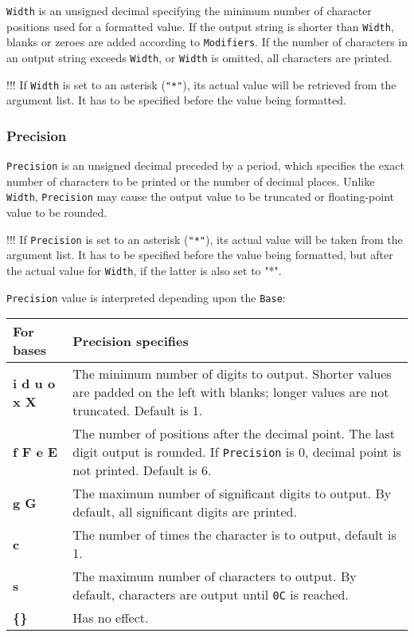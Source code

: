 \verb'Width' is an unsigned decimal specifying the minimum number of
character positions used for a formatted value. If the output string
is shorter than \verb'Width', blanks or zeroes are added according to
\verb'Modifiers'. If the number of characters in an output string exceeds
\verb'Width', or \verb'Width' is omitted, all characters are printed.

\ifcomment !!!
If {\tt Width} is set to an asterisk (\verb'"*"'), its actual value will be
retrieved from the argument list. It has to be specified before the value
being formatted.
\fi

\subsubsection{Precision}

\verb'Precision' is an unsigned decimal preceded by a period,
which specifies the exact number of characters to be printed or
the number of decimal places. Unlike \verb'Width', \verb'Precision'
may cause the output value to be truncated or floating-point value
to be rounded.

\ifcomment !!!
If {\tt Precision} is set to an asterisk (\verb'"*"'), its actual value will
be taken from the argument list. It has to be specified before the value being
formatted, but after the actual value for {\tt Width}, if the latter is also set
to "*".
\fi

{\tt Precision} value is interpreted depending upon the {\tt Base}:

\begin{tabular}{l|p{10 cm}}
\bf For bases & \bf Precision specifies \\
\hline
\bf i d u o x X &
    The minimum number of digits to output. Shorter values are padded on
    the left with blanks; longer values are not truncated. Default is 1. \\
\bf f F e E &
    The number of positions after the decimal point. The last digit output
    is rounded. If {\tt Precision} is 0, decimal point is not printed.
    Default is 6. \\
\bf g G &
    The maximum number of significant digits to output. By default,
    all significant digits are printed. \\
\bf c &
    The number of times the character is to output, default is 1. \\
\bf s &
    The maximum number of characters to output. By default, characters
    are output until \verb'0C' is reached. \\
\bf \{\} &
    Has no effect.
\end{tabular}


